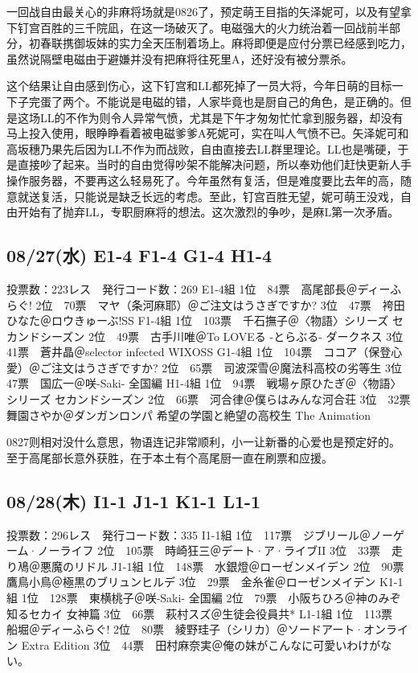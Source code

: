 一回战自由最关心的非麻将场就是0826了，预定萌王目指的矢泽妮可，以及有望拿下钉宫百胜的三千院凪，在这一场破灭了。电磁强大的火力统治着一回战前半部分，初春联携御坂妹的实力全天压制着场上。麻将即便是应付分票已经感到吃力，虽然说隔壁电磁由于避嫌并没有把麻将往死里A，还好没有被分票杀。

这个结果让自由感到伤心，这下钉宫和LL都死掉了一员大将，今年日萌的目标一下子完蛋了两个。不能说是电磁的错，人家毕竟也是厨自己的角色，是正确的。但是这场LL的不作为则令人异常气愤，尤其是下午才匆匆忙忙拿到服务器，却没有马上投入使用，眼睁睁看着被电磁爹爹A死妮可，实在叫人气愤不已。矢泽妮可和高坂穗乃果先后因为LL不作为而战败，自由直接去LL群里理论。LL也是嘴硬，于是直接吵了起来。当时的自由觉得吵架不能解决问题，所以奉劝他们赶快更新人手操作服务器，不要再这么轻易死了。今年虽然有复活，但是难度要比去年的高，随意就送复活，只能说是缺乏长远的考虑。至此，钉宫百胜无望，妮可萌王没戏，自由开始有了抛弃LL，专职厨麻将的想法。这次激烈的争吵，是麻L第一次矛盾。

\subsection{08/27(水) E1-4 F1-4 G1-4 H1-4}

    投票数：223レス　発行コード数：269
    E1-4組
    1位　84票　高尾部長＠ディーふらぐ!
    2位　70票　マヤ（条河麻耶）＠ご注文はうさぎですか?
    3位　47票　袴田ひなた＠ロウきゅーぶ!SS
    F1-4組
    1位　103票　千石撫子＠〈物語〉シリーズ セカンドシーズン
    2位　49票　古手川唯＠To LOVEる -とらぶる- ダークネス
    3位　41票　蒼井晶＠selector infected WIXOSS
    G1-4組
    1位　104票　ココア（保登心愛）＠ご注文はうさぎですか?
    2位　65票　司波深雪＠魔法科高校の劣等生
    3位　47票　国広一＠咲-Saki- 全国編
    H1-4組
    1位　94票　戦場ヶ原ひたぎ＠〈物語〉シリーズ セカンドシーズン
    2位　66票　河合律＠僕らはみんな河合荘
    3位　32票　舞園さやか＠ダンガンロンパ 希望の学園と絶望の高校生 The Animation

0827则相对没什么意思，物语连记非常顺利，小一让新番的心爱也是预定好的。
至于高尾部长意外获胜，在于本土有个高尾厨一直在刷票和应援。

\subsection{08/28(木) I1-1 J1-1 K1-1 L1-1}

    投票数：296レス　発行コード数：335
    I1-1組
    1位　117票　ジブリール＠ノーゲーム·ノーライフ
    2位　105票　時崎狂三＠デート·ア·ライブII
    3位　33票　走り鳰＠悪魔のリドル
    J1-1組
    1位　148票　水銀燈＠ローゼンメイデン
    2位　90票　鷹鳥小鳥＠極黒のブリュンヒルデ
    3位　29票　金糸雀＠ローゼンメイデン
    K1-1組
    1位　128票　東横桃子＠咲-Saki- 全国編
    2位　79票　小阪ちひろ＠神のみぞ知るセカイ 女神篇
    3位　66票　萩村スズ＠生徒会役員共*
    L1-1組
    1位　113票　船堀＠ディーふらぐ!
    2位　80票　綾野珪子（シリカ）＠ソードアート·オンライン Extra Edition
    3位　44票　田村麻奈実＠俺の妹がこんなに可愛いわけがない。

